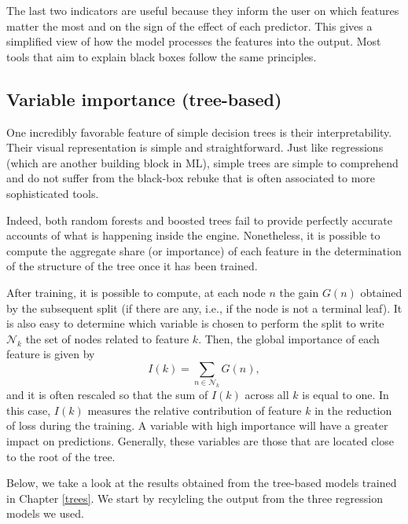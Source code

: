 \documentclass[]{krantz}
\theoremstyle{definition}
\theoremstyle{definition}
\theoremstyle{definition}
\theoremstyle{remark}
\begin{document}
The last two indicators are useful because they inform the user on which
features matter the most and on the sign of the effect of each
predictor. This gives a simplified view of how the model processes the
features into the output. Most tools that aim to explain black boxes
follow the same principles.

\hypertarget{variable-importance}{%
\subsection{Variable importance
(tree-based)}\label{variable-importance}}

One incredibly favorable feature of simple decision trees is their
interpretability. Their visual representation is simple and
straightforward. Just like regressions (which are another building block
in ML), simple trees are simple to comprehend and do not suffer from the
black-box rebuke that is often associated to more sophisticated tools.

Indeed, both random forests and boosted trees fail to provide perfectly
accurate accounts of what is happening inside the engine. Nonetheless,
it is possible to compute the aggregate share (or importance) of each
feature in the determination of the structure of the tree once it has
been trained.

After training, it is possible to compute, at each node \(n\) the gain
\(G(n)\) obtained by the subsequent split (if there are any, i.e., if
the node is not a terminal leaf). It is also easy to determine which
variable is chosen to perform the split to write \(\mathcal{N}_k\) the
set of nodes related to feature \(k\). Then, the global importance of
each feature is given by \[I(k)=\sum_{n\in \mathcal{N}_k}G(n),\] and it
is often rescaled so that the sum of \(I(k)\) across all \(k\) is equal
to one. In this case, \(I(k)\) measures the relative contribution of
feature \(k\) in the reduction of loss during the training. A variable
with high importance will have a greater impact on predictions.
Generally, these variables are those that are located close to the root
of the tree.

Below, we take a look at the results obtained from the tree-based models
trained in Chapter \ref{trees}. We start by recylcling the output from
the three regression models we used.

\footnotesize
\end{document}
